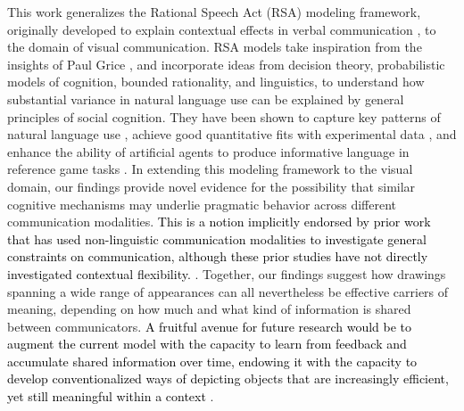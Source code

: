 \documentclass{svjour3}
\newcommand{\revised}[1]{\textcolor{Black}{#1}}
\begin{document}
This work generalizes the Rational Speech Act (RSA) modeling framework, originally developed to explain contextual effects in verbal communication \citep*{frank2012predicting,goodman2013knowledge,franke2016probabilistic,bergen2016pragmatic}, to the domain of visual communication.
RSA models take inspiration from the insights of Paul Grice \citep*{grice1975syntax}, and incorporate ideas from decision theory, probabilistic models of cognition, bounded rationality, and linguistics, to understand how substantial variance in natural language use can be explained by general principles of social cognition. 
They have been shown to capture key patterns of natural language use \citep*{goodman2013knowledge}, achieve good quantitative fits with experimental data \citep*{kao2014formalizing}, and enhance the ability of artificial agents to produce informative language in reference game tasks \citep*{monroe2017colors,Cohn-GordonGP18}.
In extending this modeling framework to the visual domain, our findings provide novel evidence for the possibility that similar cognitive mechanisms may underlie pragmatic behavior across different communication modalities. 
\revised{This is a notion implicitly endorsed by prior work that has used non-linguistic communication modalities to investigate general constraints on communication, although these prior studies have not directly investigated contextual flexibility.}
\citep*{goldin1977development,Garrod:2007wk,fay2010interactive,theisen2010systematicity,garrod2010can,Galantucci:2005uh,verhoef2014emergence}. %
Together, our findings suggest how drawings spanning a wide range of appearances can all nevertheless be effective carriers of meaning, depending on how much and what kind of information is shared between communicators. 
\revised{A fruitful avenue for future research would be to augment the current model with the capacity to learn from feedback and accumulate shared information over time, endowing it with the capacity to develop conventionalized ways of depicting objects that are increasingly efficient, yet still meaningful within a context \citep*{Garrod:2007wk,hawkinssano_cogsci_2019}}. 
\end{document}
